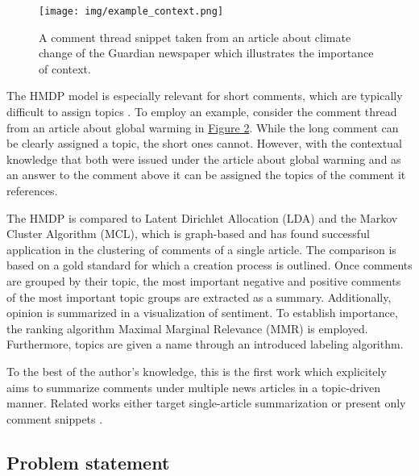 \begin{figure}[H]
\label{figcontext}
	\centering
  \texttt{[image: img/example\_context.png]}
	\caption{A comment thread snippet taken from an article about climate change of the Guardian newspaper \protect\footnotemark which illustrates the importance of context.}
\end{figure}
The HMDP model is especially relevant for short comments, which are typically difficult to assign topics \cite{DBLP:conf/ecir/AkerKBPBHG16}. To employ an example, consider the comment thread from an article about global warming in \hyperref[figcontext]{Figure 2}. While the long comment can be clearly assigned a topic, the short ones cannot. However, with the contextual knowledge that both were issued under the article about global warming and as an answer to the comment above it can be assigned the topics of the comment it references. \par
The HMDP is compared to Latent Dirichlet Allocation (LDA) and the Markov Cluster Algorithm (MCL), which is graph-based and has found successful application in the clustering of comments of a single article. The comparison is based on a gold standard for which a creation process is outlined. Once comments are grouped by their topic, the most important negative and positive comments of the most important topic groups are extracted as a summary. Additionally, opinion is summarized in a visualization of sentiment. To establish importance, the ranking algorithm Maximal Marginal Relevance (MMR) is employed. Furthermore, topics are given a name through an introduced labeling algorithm. \par
To the best of the author's knowledge, this is the first work which explicitely aims to summarize comments under multiple news articles in a topic-driven manner. Related works either target single-article summarization \cite{DBLP:conf/cikm/MaSYC12, llewellyn_grover_oberlander, DBLP:conf/ecir/AkerKBPBHG16, DBLP:conf/ecir/FunkABPHG17} or present only comment snippets \cite{Raveendran:2012:LCS:2348283.2348490}.

\subsection{Problem statement}

